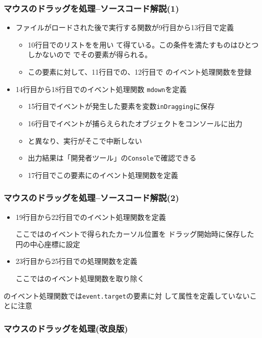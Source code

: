 \begin{frame}[containsverbatim]
 \frametitle{マウスのドラッグを処理--ソースコード解説(1)}
\begin{itemize}
 \item ファイルがロードされた後で実行する関数が9行目から13行目で定義
   \begin{itemize}
    \item 10行目でのリストをを用い
          て得ている。この条件を満たすものはひとつしかないので
          \JSKey{[0]}でその要素が得られる。
    \item この要素に対して、11行目での、12行目で
          のイベント処理関数を登録
   \end{itemize}
 \item 14行目から18行目でのイベント処理関数
       \texttt{mdown}を定義
  \begin{itemize}
   \item 15行目でイベントが発生した要素を変数\texttt{inDragging}に保存
	 \item 16行目でイベントが捕らえられたオブジェクトをコンソールに出力
	 \item {}と異なり、実行がそこで中断しない
	 \item 出力結果は「開発者ツール」の\texttt{Console}で確認できる
   \item 17行目でこの要素にのイベント処理関数を定義
  \end{itemize}
\end{itemize}
\end{frame}
\begin{frame}
 \frametitle{マウスのドラッグを処理--ソースコード解説(2)}
\begin{itemize}
\item 19行目から22行目でのイベント処理関数を定義

      ここではのイベントで得られたカーソル位置を
      ドラッグ開始時に保存した円の中心座標に設定
 \item 23行目から25行目での処理関数を定義

       ここではのイベント処理関数を取り除く
\end{itemize}

 のイベント処理関数では\texttt{event.target}の要素に対
 して属性を定義していないことに注意
\end{frame}
\begin{frame}[containsverbatim]
 \frametitle{マウスのドラッグを処理(改良版)}
\end{frame}
